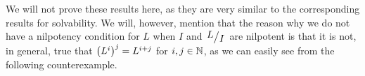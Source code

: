 We will not prove these results here, as they are very similar to the corresponding results for solvability. We will, however, mention that the reason why we do not have a nilpotency condition for $L$ when $I$ and $\quotient{L}{I}$ are nilpotent is that it is not, in general, true that $\left( L^i \right)^j = L^{i + j}$ for $i, j \in \mathbb{N}$, as we can easily see from the following counterexample.

\begin{boxcexample}
    \sorry
\end{boxcexample}
